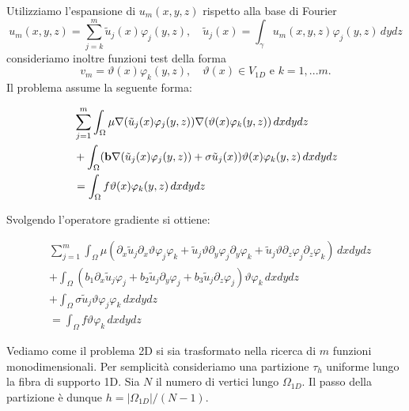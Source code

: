 Utilizziamo l'espansione di $u_m(x,y,z)$ 
rispetto alla base di Fourier 
\begin{equation}
\label{eq: espansione himod}
u_m(x,y,z)=\sum_{j=k}^m\tilde{u}_j(x)\varphi _j(y,z),\quad\tilde{u}_j(x)=\int_{\gamma}u_m(x,y,z) \varphi_j(y,z)\,dydz
\end{equation}
consideriamo inoltre funzioni test della forma 
$$v_m=\vartheta(x)\varphi _k(y,z),\quad \vartheta(x)\in V_{1D}\text{ e }
k=1,...m.$$ Il problema assume la seguente forma:

\begin{equation*}
\begin{split}
&\sum_{j=1}^m 
\int_\Omega\mu\nabla (\tilde{u}_j(x)\varphi _j(y,z))\nabla (\vartheta(x)\varphi _k(y,z))\,dxdydz\\
&+\int_\Omega(\mathbf{b}\nabla (\tilde{u}_j(x)\varphi _j(y,z))+\sigma\tilde{u}_j(x))\vartheta(x)\varphi _k(y,z)\,dxdydz\\
&=\int_\Omega f\vartheta(x)\varphi _k(y,z)\,dxdydz\\
\end{split}
\end{equation*}

Svolgendo l'operatore gradiente si ottiene:

\begin{equation*}
\begin{split}
&\sum_{j=1}^m
\int_\Omega\mu( \partial_x\tilde{u}_j \partial_x\vartheta\varphi _j\varphi _k + \tilde{u}_j \vartheta \partial_y\varphi _j\partial_y\varphi _k + \tilde{u}_j \vartheta \partial_z\varphi _j\partial_z\varphi _k)\,dxdydz \\
&+ \int_\Omega (b_1\partial_x\tilde{u}_j\varphi _j+b_2\tilde{u}_j\partial_y\varphi _j + b_3\tilde{u}_j\partial_z\varphi_j)\vartheta\varphi _k\,dxdydz\\ 
&+ \int_\Omega \sigma\tilde{u}_j\vartheta\varphi _j\varphi _k\,dxdydz \\
&=\int_\Omega f\vartheta\varphi _k\,dxdydz
\end{split}
\end{equation*}

Vediamo come il problema 2D si sia trasformato nella ricerca di $m$ funzioni monodimensionali.
Per semplicit\`a consideriamo una partizione $\tau_h$ uniforme lungo 
la fibra di supporto 1D.
Sia $N$ il numero di vertici lungo $\Omega_{1D}$.
Il passo della partizione \`e dunque $h=\vert \Omega_{1D}\vert / (N-1)$. 

